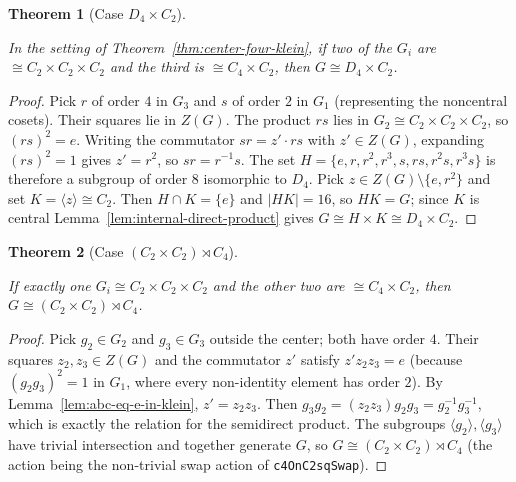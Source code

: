 \documentclass{article}
\newtheorem{theorem}{Theorem}[section]
\theoremstyle{definition}
\newcommand{\uses}[1]{}
\begin{document}
\begin{theorem}[Case $D_4 \times C_2$]
    \label{thm:case-D4-times-C2}
    \uses{lem:subgroup-product-card,lem:internal-direct-product}
    In the setting of Theorem~\ref{thm:center-four-klein}, if two of the
    $G_i$ are $\cong C_2 \times C_2 \times C_2$ and the third is
    $\cong C_4 \times C_2$, then $G \cong D_4 \times C_2$.
\end{theorem}
\begin{proof}
    \uses{lem:subgroup-product-card,lem:internal-direct-product}
    Pick $r$ of order $4$ in $G_3$ and $s$ of order $2$ in $G_1$
    (representing the noncentral cosets). Their squares lie in $Z(G)$. The
    product $rs$ lies in $G_2 \cong C_2 \times C_2 \times C_2$, so
    $(rs)^2 = e$. Writing the commutator $sr = z' \cdot rs$ with
    $z' \in Z(G)$, expanding $(rs)^2 = 1$ gives $z' = r^2$, so
    $sr = r^{-1}s$. The set
    $H = \{e, r, r^2, r^3, s, rs, r^2 s, r^3 s\}$ is therefore a subgroup of
    order $8$ isomorphic to $D_4$. Pick $z \in Z(G) \setminus \{e, r^2\}$ and
    set $K = \langle z \rangle \cong C_2$. Then $H \cap K = \{e\}$ and
    $|HK| = 16$, so $HK = G$; since $K$ is central
    Lemma~\ref{lem:internal-direct-product} gives
    $G \cong H \times K \cong D_4 \times C_2$.
\end{proof}

\begin{theorem}[Case $(C_2 \times C_2) \rtimes C_4$]
    \label{thm:case-K4-semidirect-C4}
    \uses{lem:subgroup-product-card,lem:internal-direct-product,
          lem:abc-eq-e-in-klein}
    If exactly one $G_i \cong C_2 \times C_2 \times C_2$ and the other two
    are $\cong C_4 \times C_2$, then $G \cong (C_2 \times C_2) \rtimes C_4$.
\end{theorem}
\begin{proof}
    \uses{lem:subgroup-product-card,lem:abc-eq-e-in-klein,
          lem:commutator-in-center-when-quotient-abelian}
    Pick $g_2 \in G_2$ and $g_3 \in G_3$ outside the center; both have order
    $4$. Their squares $z_2, z_3 \in Z(G)$ and the commutator $z'$ satisfy
    $z' z_2 z_3 = e$ (because $(g_2 g_3)^2 = 1$ in $G_1$, where every
    non-identity element has order $2$). By
    Lemma~\ref{lem:abc-eq-e-in-klein}, $z' = z_2 z_3$. Then
    $g_3 g_2 = (z_2 z_3) g_2 g_3 = g_2^{-1} g_3^{-1}$, which is exactly the
    relation for the semidirect product. The subgroups
    $\langle g_2 \rangle, \langle g_3 \rangle$ have trivial intersection and
    together generate $G$, so $G \cong (C_2 \times C_2) \rtimes C_4$
    (the action being the non-trivial swap action of
    \texttt{c4OnC2sqSwap}).
\end{proof}
\end{document}
